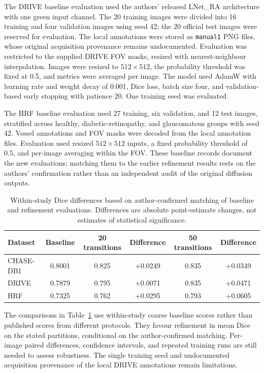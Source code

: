 \documentclass[jimaging,article,submit,pdftex,moreauthors]{Definitions/mdpi}%
\begin{document}
The DRIVE baseline evaluation used the authors' released LNet\_RA architecture with one green input channel. The 20 training images were divided into 16 training and four validation images using seed 42; the 20 official test images were reserved for evaluation. The local annotations were stored as \texttt{manual1} PNG files, whose original acquisition provenance remains undocumented. Evaluation was restricted to the supplied DRIVE FOV masks, resized with nearest-neighbour interpolation. Images were resized to $512\times512$, the probability threshold was fixed at 0.5, and metrics were averaged per image. The model used AdamW with learning rate and weight decay of 0.001, Dice loss, batch size four, and validation-based early stopping with patience 20. One training seed was evaluated.



The HRF baseline evaluation used 27 training, six validation, and 12 test images, stratified across healthy, diabetic-retinopathy, and glaucomatous groups with seed 42. Vessel annotations and FOV masks were decoded from the local annotation files. Evaluation used resized $512\times512$ inputs, a fixed probability threshold of 0.5, and per-image averaging within the FOV. These baseline records document the new evaluations; matching them to the earlier refinement results rests on the authors' confirmation rather than an independent audit of the original diffusion outputs.



\begin{table}[htbp]
\centering
\caption{Within-study Dice differences based on author-confirmed matching of baseline and refinement evaluations. Differences are absolute point-estimate changes, not estimates of statistical significance.}
\label{tab:baseline_comparison}
\begin{tabular}{lccccc}
\toprule
Dataset & Baseline & 20 transitions & Difference & 50 transitions & Difference \\
\midrule
CHASE-DB1 & 0.8001 & 0.825 & +0.0249 & 0.835 & +0.0349 \\
DRIVE & 0.7879 & 0.795 & +0.0071 & 0.835 & +0.0471 \\
HRF & 0.7325 & 0.762 & +0.0295 & 0.793 & +0.0605 \\
\bottomrule
\end{tabular}
\end{table}



The comparisons in Table~\ref{tab:baseline_comparison} use within-study coarse baseline scores rather than published scores from different protocols. They favour refinement in mean Dice on the stated partitions, conditional on the author-confirmed matching. Per-image paired differences, confidence intervals, and repeated training runs are still needed to assess robustness. The single training seed and undocumented acquisition provenance of the local DRIVE annotations remain limitations.
\end{document}
